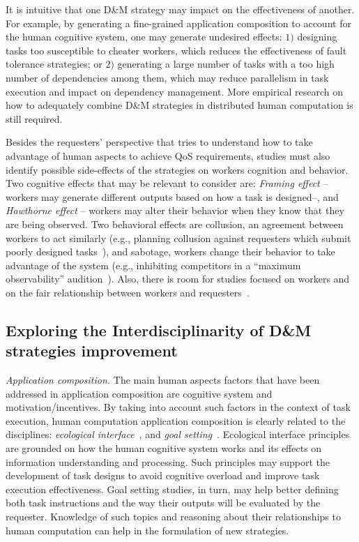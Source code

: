 \documentclass[11pt]{bmc_article_s50}
\begin{document}
It is intuitive that one D\&M strategy may impact on the effectiveness of another. For example, by generating a fine-grained application composition to account for the human cognitive system, one may generate undesired effects: $1)$ designing tasks too susceptible to cheater workers, which reduces the effectiveness of fault tolerance strategies; or $2)$ generating a large number of tasks with a too high number of dependencies among them, which may reduce parallelism in task execution and impact on dependency management. More empirical research on how to adequately combine D\&M strategies in distributed human computation is still required.

Besides the requesters' perspective that tries to understand how to take advantage of human aspects to achieve QoS requirements, studies must also identify possible side-effects of the strategies on workers cognition and behavior. Two cognitive effects that may be relevant to consider are: \textit{Framing effect} -- workers may generate different outputs based on how a task is designed--, and \textit{Hawthorne effect} -- workers may alter their behavior when they know that they are being observed. Two behavioral effects are collusion, an agreement between workers to act similarly (e.g., planning collusion against requesters which submit poorly designed tasks~\cite{Kulkarni2012}), and sabotage, workers change their behavior to take advantage of the system (e.g., inhibiting competitors in a ``maximum observability'' audition~\cite{Archak:2010}). Also, there is room for studies focused on workers and on the fair relationship between workers and requesters~\cite{Silberman:2010}. 

\subsection{Exploring the Interdisciplinarity of D\&M strategies improvement}

\textit{Application composition.} The main human aspects factors that have been addressed in application composition are cognitive system and motivation/incentives. By taking into account such factors in the context of task execution, human computation application composition is clearly related to the disciplines: \textit{ecological interface}~\cite{Rasmussen:1989}, and \textit{goal setting}~\cite{Locke:2002}. Ecological interface principles are grounded on how the human cognitive system works and its effects on information understanding and processing. Such principles may support the development of task designs to avoid cognitive overload and improve task execution effectiveness. Goal setting studies, in turn, may help better defining both task instructions and the way their outputs will be evaluated by the requester. Knowledge of such topics and reasoning about their relationships to human computation can help in the formulation of new strategies.
\end{document}
